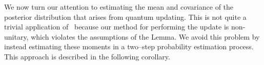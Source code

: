 \documentclass[aps,amsmath,onecolumn,amssymb,notitlepage]{revtex4-1}
\begin{document}

We now turn our attention to estimating the mean and covariance of the posterior distribution that arises from quantum updating.  This is not quite a trivial application of~ because our method for performing the update is non-unitary, which violates the assumptions of the Lemma.  We avoid this problem by instead estimating these moments in a two--step probability estimation process.  This approach is described in the following corollary.
\end{document}
